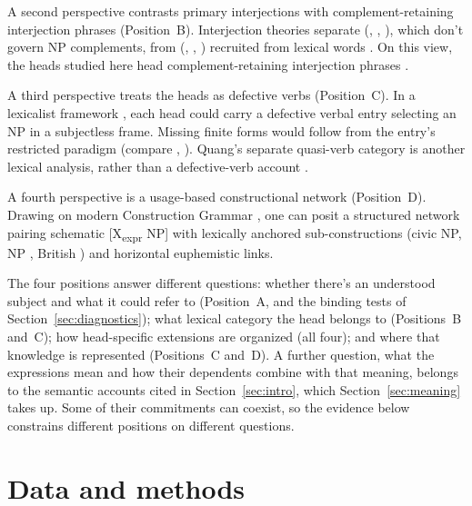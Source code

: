 \documentclass[12pt]{article}
\begin{document}
A second perspective contrasts primary interjections with complement-retaining interjection phrases (Position~B). Interjection theories separate  (, , ), which don't govern NP complements, from  (, , ) recruited from lexical words \citep{ameka1992,amekawilkins2006,meinard2015,heine2023interactives}. On this view, the heads studied here head complement-retaining interjection phrases \citep[1361 n.\ 70]{huddleston2002}.

A third perspective treats the heads as defective verbs (Position~C). In a lexicalist framework \citep{mullerwechsler2014}, each head could carry a defective verbal entry selecting an NP in a subjectless frame. Missing finite forms would follow from the entry's restricted paradigm (compare , ). Quang's separate quasi-verb category is another lexical analysis, rather than a defective-verb account \citep[5--7]{quang1971}.

A fourth perspective is a usage-based constructional network (Position~D). Drawing on modern Construction Grammar \citep{fillmore1988mechanisms,goldberg1995constructions,goldberg2003,croft2001,bybee2010,diessel2019,goldberg2019,schmid2020}, one can posit a structured network pairing schematic [X\textsubscript{expr} NP] with lexically anchored sub-constructions (civic  NP,  NP , British ) and horizontal euphemistic links.

The four positions answer different questions: whether there's an understood subject and what it could refer to (Position~A, and the binding tests of Section~\ref{sec:diagnostics}); what lexical category the head belongs to (Positions~B and~C); how head-specific extensions are organized (all four); and where that knowledge is represented (Positions~C and~D). A further question, what the expressions mean and how their dependents combine with that meaning, belongs to the semantic accounts cited in Section~\ref{sec:intro}, which Section~\ref{sec:meaning} takes up. Some of their commitments can coexist, so the evidence below constrains different positions on different questions.

\section{Data and methods}
\label{sec:methods}
\end{document}
